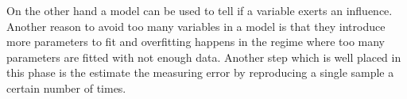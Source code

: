 On the other hand a model can be used to tell if a variable exerts an influence\cite{haertler2014statistisch}. 
%
Another reason to avoid too many variables in a model is that they introduce more parameters to fit and overfitting happens in the regime where too many parameters are fitted with not enough data.
%
Another step which is well placed in this phase is the estimate the measuring error by reproducing a single sample a certain number of times. 
%
